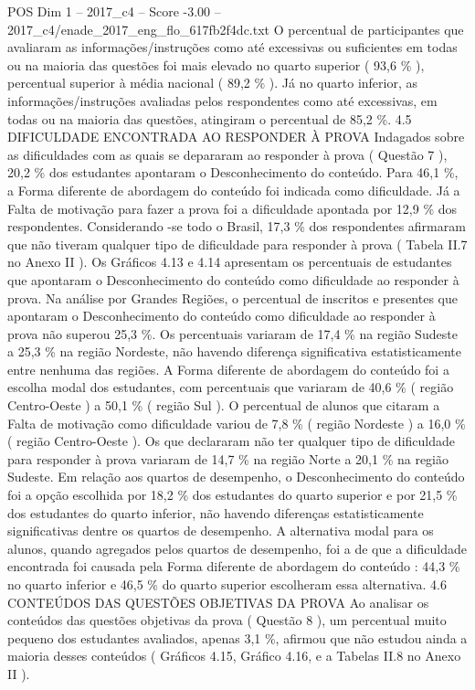 \begin{textsample}{POS Dim 1 – 2017\_c4 – Score -3.00 – 2017\_c4/enade\_2017\_eng\_flo\_617fb2f4dc.txt}
O percentual de participantes que avaliaram as informações/instruções como até excessivas ou suficientes em todas ou na maioria das questões foi mais elevado no quarto superior ( 93,6 \% ), percentual superior à média nacional ( 89,2 \% ).
Já no quarto inferior, as informações/instruções avaliadas pelos respondentes como até excessivas, em todas ou na maioria das questões, atingiram o percentual de 85,2 \%. 4.5 DIFICULDADE ENCONTRADA AO RESPONDER À PROVA Indagados sobre as dificuldades com as quais se depararam ao responder à prova ( Questão 7 ), 20,2 \% dos estudantes apontaram o Desconhecimento do conteúdo.
Para 46,1 \%, a Forma diferente de abordagem do conteúdo foi indicada como dificuldade.
Já a Falta de motivação para fazer a prova foi a dificuldade apontada por 12,9 \% dos respondentes.
Considerando -se todo o Brasil, 17,3 \% dos respondentes afirmaram que não tiveram qualquer tipo de dificuldade para responder à prova ( Tabela II.7 no Anexo II ).
Os Gráficos 4.13 e 4.14 apresentam os percentuais de estudantes que apontaram o Desconhecimento do conteúdo como dificuldade ao responder à prova.
Na análise por Grandes Regiões, o percentual de inscritos e presentes que apontaram o Desconhecimento do conteúdo como dificuldade ao responder à prova não superou 25,3 \%.
Os percentuais variaram de 17,4 \% na região Sudeste a 25,3 \% na região Nordeste, não havendo diferença significativa estatisticamente entre nenhuma das regiões.
A Forma diferente de abordagem do conteúdo foi a escolha modal dos estudantes, com percentuais que variaram de 40,6 \% ( região Centro-Oeste ) a 50,1 \% ( região Sul ).
O percentual de alunos que citaram a Falta de motivação como dificuldade variou de 7,8 \% ( região Nordeste ) a 16,0 \% ( região Centro-Oeste ).
Os que declararam não ter qualquer tipo de dificuldade para responder à prova variaram de 14,7 \% na região Norte a 20,1 \% na região Sudeste.
Em relação aos quartos de desempenho, o Desconhecimento do conteúdo foi a opção escolhida por 18,2 \% dos estudantes do quarto superior e por 21,5 \% dos estudantes do quarto inferior, não havendo diferenças estatisticamente significativas dentre os quartos de desempenho.
A alternativa modal para os alunos, quando agregados pelos quartos de desempenho, foi a de que a dificuldade encontrada foi causada pela Forma diferente de abordagem do conteúdo : 44,3 \% no quarto inferior e 46,5 \% do quarto superior escolheram essa alternativa. 4.6 CONTEÚDOS DAS QUESTÕES OBJETIVAS DA PROVA Ao analisar os conteúdos das questões objetivas da prova ( Questão 8 ), um percentual muito pequeno dos estudantes avaliados, apenas 3,1 \%, afirmou que não estudou ainda a maioria desses conteúdos ( Gráficos 4.15, Gráfico 4.16, e a Tabelas II.8 no Anexo II ).

\end{textsample}
